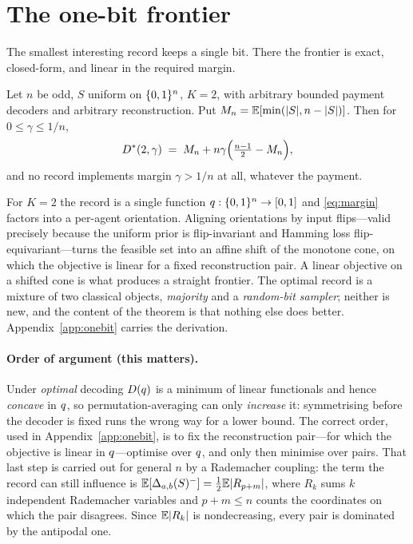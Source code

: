 \section{The one-bit frontier}
\label{sec:onebit}

The smallest interesting record keeps a single bit. There the frontier is exact,
closed-form, and linear in the required margin.

\begin{theorem}
\label{thm:onebit}
Let $n$ be odd, $S$ uniform on $\{0,1\}^n$, $K = 2$, with arbitrary bounded payment
decoders and arbitrary reconstruction. Put
$M_n = \mathbb{E}[\min(|S|, n-|S|)]$. Then for $0 \le \gamma \le 1/n$,
\[
  D^\ast(2,\gamma) \;=\; M_n + n\gamma\Bigl(\tfrac{n-1}{2} - M_n\Bigr),
\]
and no record implements margin $\gamma > 1/n$ at all, whatever the payment.
\end{theorem}

For $K = 2$ the record is a single function $q : \{0,1\}^n \to [0,1]$ and
\eqref{eq:margin} factors into a per-agent orientation. Aligning orientations by
input flips---valid precisely because the uniform prior is flip-invariant and
Hamming loss flip-equivariant---turns the feasible set into an affine shift of
the monotone cone, on which the objective is linear for a fixed reconstruction
pair. A linear objective on a shifted cone is what produces a straight frontier.
The optimal record is a mixture of two classical objects, \emph{majority} and a
\emph{random-bit sampler}; neither is new, and the content of the theorem is that
nothing else does better. Appendix~\ref{app:onebit} carries the derivation.

\paragraph{Order of argument (this matters).}
Under \emph{optimal} decoding $D(q)$ is a minimum of linear functionals and
hence \emph{concave} in $q$, so permutation-averaging can only \emph{increase}
it: symmetrising before the decoder is fixed runs the wrong way for a lower
bound. The correct order, used in Appendix~\ref{app:onebit}, is to fix the
reconstruction pair---for which the objective is linear in $q$---optimise over
$q$, and only then minimise over pairs. That last step is carried out for
general $n$ by a Rademacher coupling: the term the record can still influence is
$\mathbb{E}[\Delta_{a,b}(S)^-] = \tfrac12\mathbb{E}|R_{p+m}|$, where $R_k$ sums $k$ independent
Rademacher variables and $p+m \le n$ counts the coordinates on which the pair
disagrees. Since $\mathbb{E}|R_k|$ is nondecreasing, every pair is dominated by the
antipodal one.

